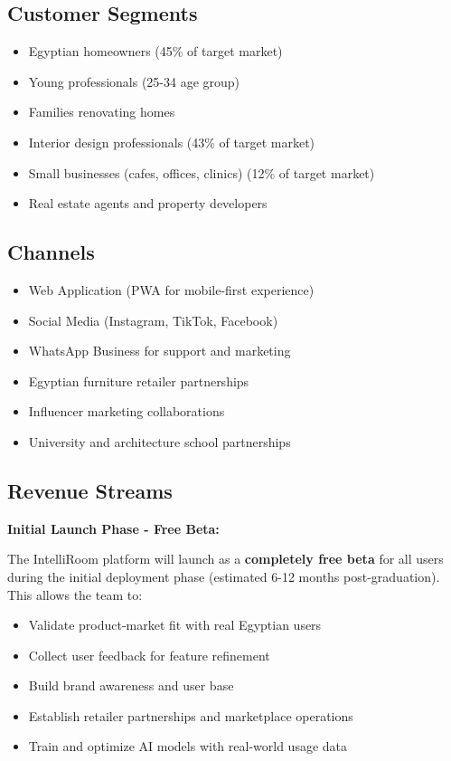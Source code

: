\subsection{Customer Segments}

\begin{itemize}
    \item Egyptian homeowners (45\% of target market)
    \item Young professionals (25-34 age group)
    \item Families renovating homes
    \item Interior design professionals (43\% of target market)
    \item Small businesses (cafes, offices, clinics) (12\% of target market)
    \item Real estate agents and property developers
\end{itemize}

\subsection{Channels}

\begin{itemize}
    \item Web Application (PWA for mobile-first experience)
    \item Social Media (Instagram, TikTok, Facebook)
    \item WhatsApp Business for support and marketing
    \item Egyptian furniture retailer partnerships
    \item Influencer marketing collaborations
    \item University and architecture school partnerships
\end{itemize}

\subsection{Revenue Streams}

\textbf{Initial Launch Phase - Free Beta:}

The IntelliRoom platform will launch as a \textbf{completely free beta} for all users during the initial deployment phase (estimated 6-12 months post-graduation). This allows the team to:
\begin{itemize}
    \item Validate product-market fit with real Egyptian users
    \item Collect user feedback for feature refinement
    \item Build brand awareness and user base
    \item Establish retailer partnerships and marketplace operations
    \item Train and optimize AI models with real-world usage data
\end{itemize}

